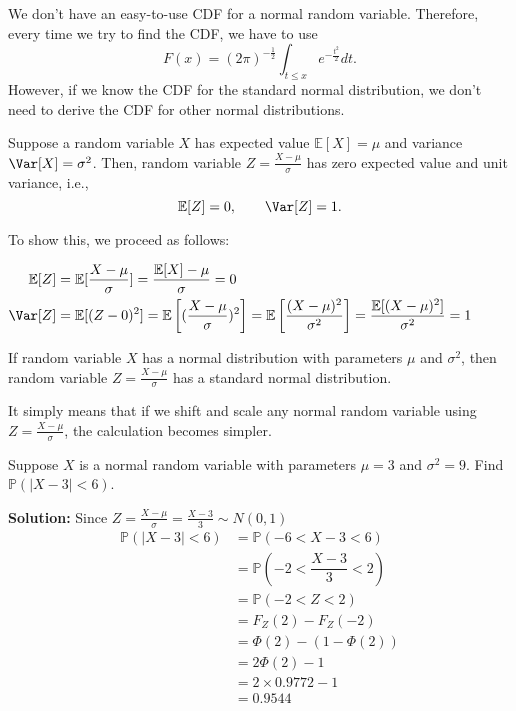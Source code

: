 We don't have an easy-to-use CDF for a normal random variable. Therefore, every time we try to find the CDF, we have to use
\[
    F(x) = (2\pi)^{-\frac{1}{2}} \int_{t \leq x} e^{-\frac{t^2}{2}}dt. 
\]
However, if we know the CDF for the standard normal distribution, we don't need to derive the CDF for other normal distributions.

Suppose a random variable \(X\) has expected value \(\mathbb{E}[X] = \mu\) and variance \(\Var[X] = \sigma^2\). Then, random variable \(Z = \frac{X - \mu}{\sigma}\) has zero expected value and unit variance, i.e.,
\[
    \mathbb{E}[Z] = 0, \quad\quad \Var[Z] = 1.
\]

To show this, we proceed as follows: 

\(
\begin{aligned}
    \mathbb{E}[Z] &= \mathbb{E}[\dfrac{X - \mu}{\sigma}] = \dfrac{\mathbb{E}[X] - \mu}{\sigma} = 0 \\
    \Var[Z] &= \mathbb{E}[(Z - 0)^2] = \mathbb{E}\left[(\dfrac{X - \mu}{\sigma})^2\right] = \mathbb{E}\left[\dfrac{(X - \mu)^2}{\sigma^2}\right] = \dfrac{\mathbb{E}[(X - \mu)^2]}{\sigma^2} = 1
\end{aligned}
\) 

If random variable \(X\) has a normal distribution with parameters \(\mu\) and \(\sigma^2\), then random variable \(Z = \frac{X - \mu}{\sigma}\) has a standard normal distribution.

It simply means that if we shift and scale any normal random variable using \(Z = \frac{X - \mu}{\sigma}\), the calculation becomes simpler.

\begin{eg}
    Suppose \(X\) is a normal random variable with parameters \(\mu = 3\) and \(\sigma^2 = 9\). Find \(\mathbb{P}(\vert X - 3 \vert < 6)\).

    \textbf{Solution:} 
    Since \(Z = \frac{X - \mu}{\sigma} = \frac{X - 3}{3} \sim N(0, 1)\) 
    \[
        \begin{aligned}
            \mathbb{P}(\vert X - 3 \vert < 6) &= \mathbb{P}(-6 <  X - 3 < 6) \\
            &= \mathbb{P}(-2 < \dfrac{X - 3}{3} < 2) \\
            &= \mathbb{P}(-2 < Z < 2) \\
            &= F_Z(2) - F_Z(-2) \\
            &= \varPhi (2) - (1 - \varPhi (2)) \\
            &= 2\varPhi (2) - 1 \\
            &= 2 \times 0.9772 - 1 \\
            &= 0.9544
        \end{aligned}
    \]
\end{eg}

